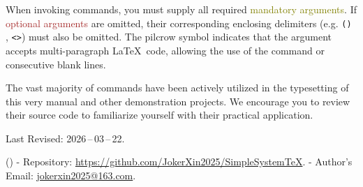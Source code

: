 When invoking \SimpleSystemTeX commands, you must supply all required \textcolor{olive}{mandatory arguments}. If \textcolor{brown}{optional arguments} are omitted, their corresponding enclosing delimiters (e.g. \texttt{()} , \texttt{<>}) must also be omitted. The pilcrow symbol \texttt{\longarg} indicates that the argument accepts multi-paragraph \LaTeX\ code, allowing the use of the  command or consecutive blank lines.

The vast majority of \SimpleSystemTeX commands have been actively utilized in the typesetting of this very manual and other demonstration projects. We encourage you to review their source code to familiarize yourself with their practical application.

Last Revised: 2026\,--\,03\,--\,22.

\bigskip\bigskip\bigskip

(){
    - \SimpleSystemTeX Repository: \href{https://github.com/JokerXin2025/SimpleSystemTeX}{https://github.com/JokerXin2025/SimpleSystemTeX}.
    - Author's Email: \href{mailto:jokerxin2025@163.com}{jokerxin2025@163.com}.
}

\newpage
